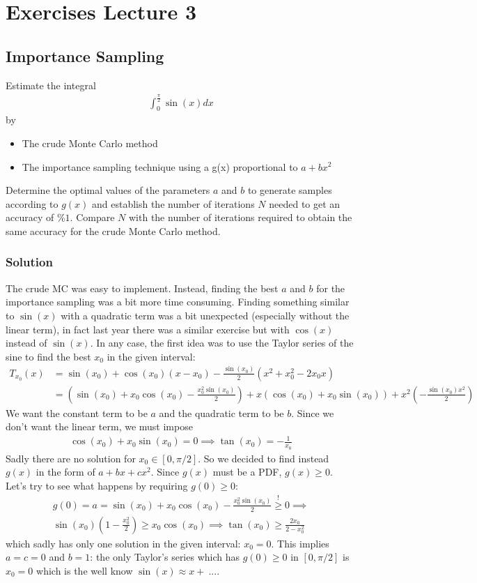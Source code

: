 \documentclass[../main.tex]{subfiles}
\begin{document}
\chapter{Exercises Lecture 3}

\section{Importance Sampling}
Estimate the integral
\begin{align}
    \int_0^{\frac{\pi}{2}}\sin(x)dx
\end{align}
by
\begin{itemize}
    \item The crude Monte Carlo method
    \item The importance sampling technique using a g(x) proportional to $a+bx^2$
\end{itemize}
Determine the optimal values of the parameters $a$ and $b$ to generate samples according to $g(x)$ and establish the number of iterations $N$ needed to get an accuracy of $\%1$. Compare $N$ with the number of iterations required to obtain the same accuracy for the crude Monte Carlo method.

\subsection{Solution}
The crude MC was easy to implement. Instead, finding the best $a$ and $b$ for the importance sampling was a bit more time consuming. Finding something similar to $\sin(x)$ with a quadratic term was a bit unexpected (especially without the linear term), in fact last year there was a similar exercise but with $\cos(x)$ instead of $\sin(x)$. In any case, the first idea was to use the Taylor series of the sine to find the best $x_0$ in the given interval:
\begin{align}
   T_{x_0}(x) &= \sin(x_0) + \cos(x_0)(x-x_0) - \frac{\sin(x_0)}{2}(x^2 + x_0^2 -2x_0x) \\
    &= \left(\sin(x_0) + x_0\cos(x_0) -  \frac{x_0^2\sin(x_0)}{2}\right) + x\left(\cos(x_0) + x_0\sin(x_0)\right) + x^2\left(-\frac{\sin(x_0)x^2}{2} \right)
\end{align}
We want the constant term to be $a$ and the quadratic term to be $b$. Since we don't want the linear term, we must impose
\begin{align}
   \cos(x_0) + x_0\sin(x_0) = 0 \implies \tan(x_0) = -\frac{1}{x_0}
\end{align} Sadly there are no solution for $x_0 \in [0, \pi/2]$.
So we decided to find instead $g(x)$ in the form of $a+bx+cx^2$. Since $g(x)$ must be a PDF, $g(x) \ge 0$. Let's try to see what happens by requiring $g(0) \ge 0$:
\begin{align}
  g(0) = a = \sin(x_0) + x_0\cos(x_0) -  \frac{x_0^2\sin(x_0)}{2} \overset{!}{\ge} 0 \implies \\
  \sin(x_0)\left( 1-\frac{x_0^2}{2}\right) \ge x_0\cos(x_0) \implies \tan(x_0) \ge \frac{2x_0}{2-x_0^2}
\end{align} which sadly has only one solution in the given interval: $x_0=0$.
This implies $a = c = 0$ and $b=1$: the only Taylor's series which has $g(0) \ge 0$ in $[0, \pi/2]$ is $x_0 = 0$ which is the well know $\sin(x) \approx x +\ ...$.
\end{document}
